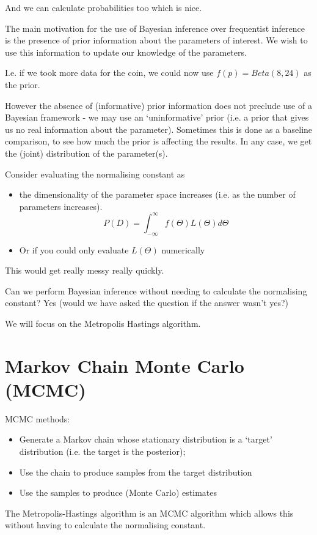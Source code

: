 \documentclass{X:/Documents/Coding/Latex/myassignment}
\begin{document}
And we can calculate probabilities too which is nice.


The main motivation for the use of Bayesian inference over frequentist inference is the presence of prior information about the parameters of interest. We wish to use this information to update our knowledge of the parameters.

I.e. if we took more data for the coin, we could now use $f(p)= Beta(8,24)$ as the prior.

However the absence of (informative) prior information does not preclude use of a Bayesian framework - we may use an `uninformative' prior (i.e. a prior that gives us no real information about the parameter). Sometimes this is done as a baseline comparison, to see how much the prior is affecting the results. In any case, we get the (joint) distribution of the parameter(s).

Consider evaluating the normalising constant as
\begin{itemize}
    \item the dimensionality of the parameter space increases (i.e. as the number of parameters increases).
\[P(D) = \int_{-\infty}^{\infty} f(\Theta) L(\Theta) d\Theta\]
    \item Or if you could only evaluate $L(\Theta)$ numerically
\end{itemize}
This would get really messy really quickly.

Can we perform Bayesian inference without needing to calculate the normalising constant? Yes (would we have asked the question if the answer wasn't yes?)

We will focus on the Metropolis Hastings algorithm.


\section{Markov Chain Monte Carlo (MCMC)}
MCMC methods:
\begin{itemize}
    \item Generate a Markov chain whose stationary distribution is a `target' distribution (i.e. the target is the posterior);
    \item Use the chain to produce samples from the target distribution
    \item Use the samples to produce (Monte Carlo) estimates
\end{itemize}

The Metropolis-Hastings algorithm is an MCMC algorithm which allows this without having to calculate the normalising constant.
\end{document}
